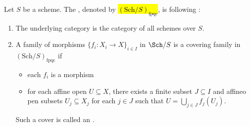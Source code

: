 \begin{definition} \label{definition:big_fpqc_site_of_a_scheme}
    \TODO{}
Let $S$ be a scheme. The , denoted by \hl{$(\mathrm{Sch}/S)_{\mathrm{fpqc}}$}, is following :
\begin{enumerate}
    \item The underlying category is the category  of all schemes over $S$.

    \item A family of morphisms $\{f_i: X_i \to X\}_{i \in I}$ in $\Sch/S$ is a covering family in $(\mathrm{Sch}/S)_{\mathrm{fpqc}}$ if 
    \begin{itemize}
        \item each $f_i$ is a  morphism 
        \item for each affine open $U \subseteq X$, there exists a finite subset $J \subseteq I$ and affineo pen subsets $U_j \subseteq X_j$ for each $j \in J$ such that $U = \bigcup_{j \in J} f_j(U_j)$. 
    \end{itemize}
    Such a cover is called an .
\end{enumerate}
\end{definition}